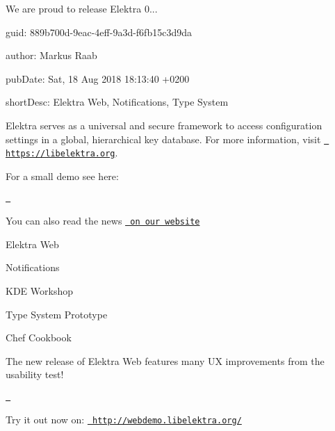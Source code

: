 We are proud to release Elektra 0...


\begin{DoxyItemize}
\item guid\+: 889b700d-\/9eac-\/4eff-\/9a3d-\/f6fb15c3d9da
\item author\+: Markus Raab
\item pub\+Date\+: Sat, 18 Aug 2018 18\+:13\+:40 +0200
\item short\+Desc\+: Elektra Web, Notifications, Type System
\end{DoxyItemize}

Elektra serves as a universal and secure framework to access configuration settings in a global, hierarchical key database. For more information, visit \href{https://libelektra.org}{\texttt{ https\+://libelektra.\+org}}.

For a small demo see here\+:

\href{https://asciinema.org/a/cantr04assr4jkv8v34uz9b8r}{\texttt{ }}

You can also read the news \href{https://www.libelektra.org/news/0.8.24-release}{\texttt{ on our website}}


\begin{DoxyItemize}
\item Elektra Web
\item Notifications
\item K\+DE Workshop
\item Type System Prototype
\item Chef Cookbook
\end{DoxyItemize}

The new release of Elektra Web features many UX improvements from the usability test!

\href{https://www.youtube.com/watch?v=lLg9sk6Hx-E}{\texttt{ }}

Try it out now on\+: \href{http://webdemo.libelektra.org/}{\texttt{ http\+://webdemo.\+libelektra.\+org/}}


